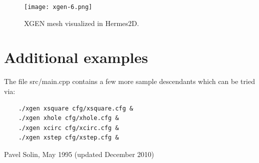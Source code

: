 \documentclass[12pt]{article}
\begin{document}
\newpage

  \begin{figure}[!ht]
  \begin{center}
  \texttt{[image: xgen-6.png]}
  \end{center}
  \vspace{-6mm}
  \caption{XGEN mesh visualized in Hermes2D.}
  \label{fig:hermes}
  \end{figure}

  \section{Additional examples}

  The file src/main.cpp contains a few more sample descendants which 
  can be tried via:

  \begin{verbatim}
    ./xgen xsquare cfg/xsquare.cfg &
    ./xgen xhole cfg/xhole.cfg &
    ./xgen xcirc cfg/xcirc.cfg &
    ./xgen xstep cfg/xstep.cfg &
  \end{verbatim}


  \hbox{} \hfill Pavel Solin, May 1995 (updated December 2010)
\end{document}
